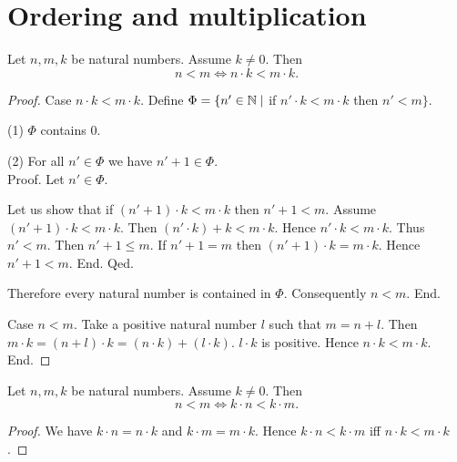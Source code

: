 \documentclass[../arithmetic.tex]{subfiles}
\begin{document}
  \section{Ordering and multiplication}

  \begin{forthel}
    \begin{proposition}
      Let $n, m, k$ be natural numbers.
      Assume $k \neq 0$.
      Then \[ n < m \iff n \cdot k < m \cdot k. \]
    \end{proposition}
    \begin{proof}
      Case $n \cdot k < m \cdot k$.
        Define $\Phi = \{ n' \in \mathbb{N} \mid$ if $n' \cdot k < m \cdot k$ then
        $n' < m \}$.

        (1) $\Phi$ contains $0$.

        (2) For all $n' \in \Phi$ we have $n' + 1 \in \Phi$. \\
        Proof.
          Let $n' \in \Phi$.

          Let us show that if $(n' + 1) \cdot k < m \cdot k$ then $n' + 1 < m$.
            Assume $(n' + 1) \cdot k < m \cdot k$.
            Then $(n' \cdot k) + k < m \cdot k$.
            Hence $n' \cdot k < m \cdot k$.
            Thus $n' < m$.
            Then $n' + 1 \leq m$.
            If $n' + 1 = m$ then $(n' + 1) \cdot k = m \cdot k$.
            Hence $n' + 1 < m$.
          End.
        Qed.

        Therefore every natural number is contained in $\Phi$.
        Consequently $n < m$.
      End.

      Case $n < m$.
        Take a positive natural number $l$ such that $m = n + l$.
        Then $m \cdot k = (n + l) \cdot k = (n \cdot k) + (l \cdot k)$.
        $l \cdot k$ is positive.
        Hence $n \cdot k < m \cdot k$.
      End.
    \end{proof}
  \end{forthel}

  \begin{forthel}
    \begin{corollary}
      Let $n, m, k$ be natural numbers.
      Assume $k \neq 0$.
      Then \[ n < m \iff k \cdot n < k \cdot m. \]
    \end{corollary}
    \begin{proof}
      We have $k \cdot n = n \cdot k$ and $k \cdot m = m \cdot k$.
      Hence $k \cdot n < k \cdot m$ iff $n \cdot k < m \cdot k$.
    \end{proof}
  \end{forthel}
\end{document}
